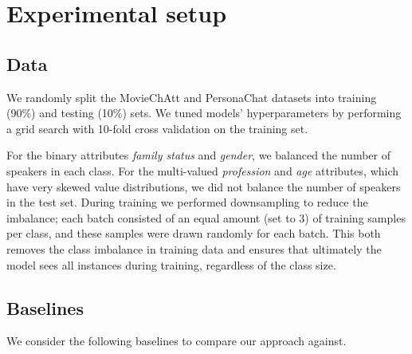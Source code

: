 \section{Experimental setup}

\subsection{Data}
We randomly split the MovieChAtt and PersonaChat 
datasets into training (90\%) and testing (10\%) sets.
We tuned models' hyperparameters by performing a grid search with 10-fold cross validation on the training set.

For the binary attributes \textit{family status} and \textit{gender}, we balanced the number of speakers in each class.
For the multi-valued \textit{profession} and \textit{age} attributes, which have very skewed value distributions, we did not balance
the number of speakers in the test set. During training we performed downsampling to reduce the imbalance;
each batch consisted of an equal amount (set to $3$) of training samples per class, and these samples were drawn randomly for each batch. This both removes the class imbalance in training data and ensures that ultimately the model sees all instances during training, regardless of the class size.


\setlength\dashlinedash{0.2pt}
\setlength\dashlinegap{1.5pt}
\setlength\arrayrulewidth{0.3pt}


\subsection{Baselines}
\label{sec:baselines}
We consider the following baselines to compare our approach against.


